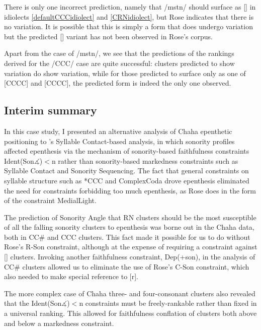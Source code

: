 \documentclass[12pt]{article}
\begin{document}
There is only one incorrect prediction, namely that /mstn/ should surface as [] in idiolects \ref{defaultCCCidiolect} and \ref{CRNidiolect}, but Rose indicates that there is no variation. It is possible that this is simply a form that does undergo variation but the predicted [] variant has not been observed in Rose's corpus.

Apart from the case of /mstn/, we see that the predictions of the rankings derived for the /CCC/ case are quite successful: clusters predicted to show variation do show variation, while for those predicted to surface only as one of [CCCC] and [CCCC], the predicted form is indeed the only one observed.

\subsection{Interim summary}

In this case study, I presented an alternative analysis of Chaha epenthetic positioning to \citet{rose.2000}'s Syllable Contact-based analysis, in which sonority profiles affected epenthesis via the mechanism of sonority-based faithfulness constraints {\sc Ident(Son$\measuredangle$)}$<$n rather than sonority-based markedness constraints such as Syllable Contact and Sonority Sequencing. The fact that general constraints on syllable structure such as *CCC and {\sc *ComplexCoda} drove epenthesis eliminated the need for constraints forbidding too much epenthesis, as Rose does in the form of the constraint {\sc *MedialLight}.

The prediction of {\sc Sonority Angle} that RN clusters should be the most susceptible of all the falling sonority clusters to epenthesis was borne out in the Chaha data, both in CC\# and CCC clusters. This fact made it possible for us to do without Rose's {\sc *R-Son} constraint, although at the expense of requiring a constraint against [] clusters. Invoking another faithfulness constraint, {\sc Dep}(+son), in the analysis of CC\# clusters allowed us to eliminate the use of Rose's {\sc *C-Son} constraint, which also needed to make special reference to [r].

The more complex case of Chaha three- and four-consonant clusters also revealed that the {\sc Ident(Son$\measuredangle$)}$<$n constraints must be freely-rankable rather than fixed in a universal ranking. This allowed for faithfulness conflation of clusters both above and below a markedness constraint.
\end{document}
